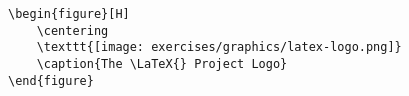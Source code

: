 \begin{verbatim}
\begin{figure}[H]
	\centering
	\texttt{[image: exercises/graphics/latex-logo.png]}
	\caption{The \LaTeX{} Project Logo}
\end{figure}
\end{verbatim}
